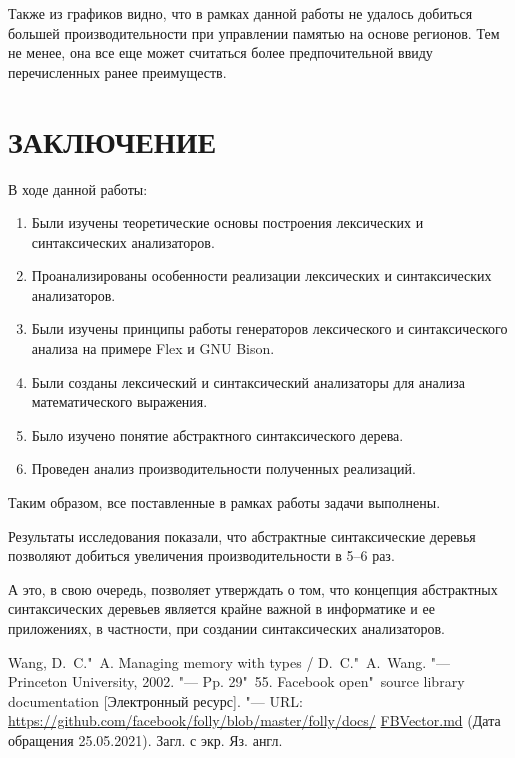 \documentclass[bachelor, och, coursework]{SCWorks}
\begin{document}
    Также из графиков видно, что в рамках данной работы не удалось добиться большей производительности при 
    управлении памятью на основе регионов. Тем не менее, она все еще может считаться более предпочительной 
    ввиду перечисленных ранее преимуществ.

    \section*{\hfill ЗАКЛЮЧЕНИЕ \hfill}
    В ходе данной работы:
    \begin{enumerate}
        \item Были изучены теоретические основы построения лексических и синтаксических анализаторов.
        \item Проанализированы особенности реализации лексических и синтаксических анализаторов.
        \item Были изучены принципы работы генераторов лексического и синтаксического анализа на примере Flex и GNU Bison.
        \item Были созданы лексический и синтаксический анализаторы для анализа математического выражения.
        \item Было изучено понятие абстрактного синтаксического дерева.
        \item Проведен анализ производительности полученных реализаций.
    \end{enumerate}
        
    Таким образом, все поставленные в рамках работы задачи выполнены.
    
    Результаты исследования показали, что абстрактные синтаксические деревья позволяют добиться увеличения 
    производительности в 5–6 раз.
    
    А это, в свою очередь, позволяет утверждать о том, что концепция абстрактных синтаксических деревьев 
    является крайне важной в информатике и ее приложениях, в частности, при создании синтаксических анализаторов.

    \begin{thebibliography}{2}
         Wang, D.~C."~A. Managing memory with types / D.~C."~A.~Wang. "--- Princeton
        University, 2002. "--- Pp. 29"~55.
         Facebook open"~source library documentation [Электронный ресурс]. "---
        URL: \href{https://github.com/facebook/folly/blob/master/folly/docs/}{https://github.com/facebook/folly/blob/master/folly/docs/}
        \href{https://github.com/facebook/folly/blob/master/folly/docs/}{FBVector.md} (Дата обращения 25.05.2021). Загл. с экр. Яз. англ.
    \end{thebibliography}
    
\end{document}
